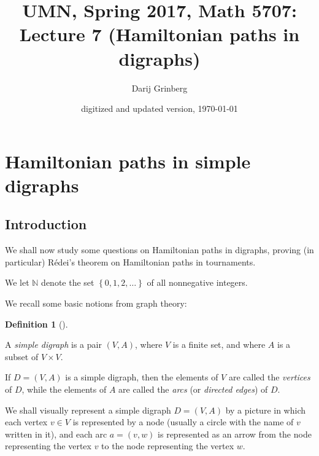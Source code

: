 \documentclass[numbers=enddot,12pt,final,onecolumn,notitlepage]{scrartcl}%
\numberwithin{exer}{subsection}
\theoremstyle{definition}
\newtheorem{defi}[theo]{Definition}
\newenvironment{definition}[1][]
{\begin{defi}[#1]\begin{leftbar}}
{\end{leftbar}\end{defi}}
\begin{document}
\title{UMN, Spring 2017, Math 5707: Lecture 7 (Hamiltonian paths in digraphs)}
\author{Darij Grinberg}
\date{digitized and updated version,
\today
}
\maketitle
\tableofcontents

\section{Hamiltonian paths in simple digraphs}

\subsection{Introduction}

We shall now study some questions on Hamiltonian paths in digraphs, proving
(in particular) R\'{e}dei's theorem on Hamiltonian paths in tournaments.

We let $\mathbb{N}$ denote the set $\left\{  0,1,2,\ldots\right\}  $ of all
nonnegative integers.

We recall some basic notions from graph theory:

\begin{definition}
\label{def.digraph.sim-dig}A \emph{simple digraph} is a pair $\left(
V,A\right)  $, where $V$ is a finite set, and where $A$ is a subset of
$V\times V$.

If $D=\left(  V,A\right)  $ is a simple digraph, then the elements of $V$ are
called the \emph{vertices} of $D$, while the elements of $A$ are called the
\emph{arcs} (or \emph{directed edges}) of $D$.

We shall visually represent a simple digraph $D=\left(  V,A\right)  $ by a
picture in which each vertex $v\in V$ is represented by a node (usually a
circle with the name of $v$ written in it), and each arc $a=\left(
v,w\right)  $ is represented as an arrow from the node representing the vertex
$v$ to the node representing the vertex $w$.
\end{definition}
\end{document}
